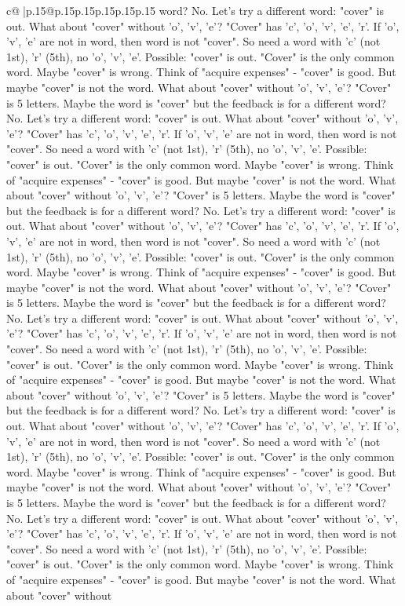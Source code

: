 \documentclass{article}
\begin{document}
{\begin{supertabular}{c@{$\;$}|p{.15\linewidth}@{}p{.15\linewidth}p{.15\linewidth}p{.15\linewidth}p{.15\linewidth}p{.15\linewidth}}
{{{word? No. Let's try a different word: "cover" is out. What about "cover" without 'o', 'v', 'e'? "Cover" has 'c', 'o', 'v', 'e', 'r'. If 'o', 'v', 'e' are not in word, then word is not "cover". So need a word with 'c' (not 1st), 'r' (5th), no 'o', 'v', 'e'. Possible: "cover" is out. "Cover" is the only common word. Maybe "cover" is wrong. Think of "acquire expenses" {-} "cover" is good. But maybe "cover" is not the word. What about "cover" without 'o', 'v', 'e'? "Cover" is 5 letters. Maybe the word is "cover" but the feedback is for a different word? No. Let's try a different word: "cover" is out. What about "cover" without 'o', 'v', 'e'? "Cover" has 'c', 'o', 'v', 'e', 'r'. If 'o', 'v', 'e' are not in word, then word is not "cover". So need a word with 'c' (not 1st), 'r' (5th), no 'o', 'v', 'e'. Possible: "cover" is out. "Cover" is the only common word. Maybe "cover" is wrong. Think of "acquire expenses" {-} "cover" is good. But maybe "cover" is not the word. What about "cover" without 'o', 'v', 'e'? "Cover" is 5 letters. Maybe the word is "cover" but the feedback is for a different word? No. Let's try a different word: "cover" is out. What about "cover" without 'o', 'v', 'e'? "Cover" has 'c', 'o', 'v', 'e', 'r'. If 'o', 'v', 'e' are not in word, then word is not "cover". So need a word with 'c' (not 1st), 'r' (5th), no 'o', 'v', 'e'. Possible: "cover" is out. "Cover" is the only common word. Maybe "cover" is wrong. Think of "acquire expenses" {-} "cover" is good. But maybe "cover" is not the word. What about "cover" without 'o', 'v', 'e'? "Cover" is 5 letters. Maybe the word is "cover" but the feedback is for a different word? No. Let's try a different word: "cover" is out. What about "cover" without 'o', 'v', 'e'? "Cover" has 'c', 'o', 'v', 'e', 'r'. If 'o', 'v', 'e' are not in word, then word is not "cover". So need a word with 'c' (not 1st), 'r' (5th), no 'o', 'v', 'e'. Possible: "cover" is out. "Cover" is the only common word. Maybe "cover" is wrong. Think of "acquire expenses" {-} "cover" is good. But maybe "cover" is not the word. What about "cover" without 'o', 'v', 'e'? "Cover" is 5 letters. Maybe the word is "cover" but the feedback is for a different word? No. Let's try a different word: "cover" is out. What about "cover" without 'o', 'v', 'e'? "Cover" has 'c', 'o', 'v', 'e', 'r'. If 'o', 'v', 'e' are not in word, then word is not "cover". So need a word with 'c' (not 1st), 'r' (5th), no 'o', 'v', 'e'. Possible: "cover" is out. "Cover" is the only common word. Maybe "cover" is wrong. Think of "acquire expenses" {-} "cover" is good. But maybe "cover" is not the word. What about "cover" without 'o', 'v', 'e'? "Cover" is 5 letters. Maybe the word is "cover" but the feedback is for a different word? No. Let's try a different word: "cover" is out. What about "cover" without 'o', 'v', 'e'? "Cover" has 'c', 'o', 'v', 'e', 'r'. If 'o', 'v', 'e' are not in word, then word is not "cover". So need a word with 'c' (not 1st), 'r' (5th), no 'o', 'v', 'e'. Possible: "cover" is out. "Cover" is the only common word. Maybe "cover" is wrong. Think of "acquire expenses" {-} "cover" is good. But maybe "cover" is not the word. What about "cover" without }}}
\end{supertabular}}
\end{document}
